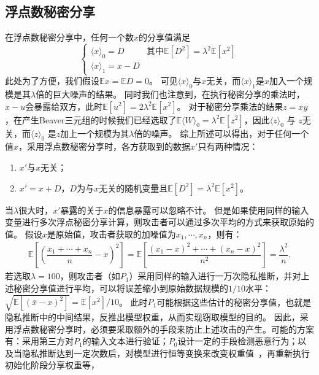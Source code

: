 \subsection{浮点数秘密分享}
在浮点数秘密分享中，任何一个数$x$的分享值满足
\begin{equation}
\begin{cases}
    \langle x \rangle_0 = D & \text{其中} \mathbb E[D^2] = \lambda^2 \mathbb E[x^2] \\
    \langle x \rangle_1 = x - D
\end{cases}
\end{equation}
此处为了方便，我们假设$\mathbb Ex = \mathbb ED = 0$。
%
可见$\langle x \rangle_0$与$x$无关，而$\langle x \rangle_1$是$x$加入一个规模是其$\lambda$倍的巨大噪声的结果。
%
同时我们也注意到，在执行秘密分享的乘法时，$x - u$会暴露给双方，此时$\mathbb E[u^2] = 2\lambda^2 \mathbb E[x^2]$。
%
对于秘密分享乘法的结果$z = xy$，在产生Beaver三元组的时候我们已经选取了$\mathbb E \langle W \rangle_0 = \lambda^2 \mathbb E[z^2]$，因此$\langle z \rangle_0$ 与 $z$无关，而$\langle z \rangle_0$ 是$z$加上一个规模为其$\lambda$倍的噪声。
%
综上所述可以得出，对于任何一个值$x$，采用浮点数秘密分享时，各方获取到的数据$x'$只有两种情况：
\begin{enumerate}[label=(\arabic*)]
    \item $x'$与$x$无关；
    \item $x' = x + D$，$D$为与$x$无关的随机变量且$\mathbb E[D^2] = \lambda^2 \mathbb E[x^2]$。
\end{enumerate}
%
当$\lambda$很大时，$x'$暴露的关于$x$的信息暴露可以忽略不计。
%
但是如果使用同样的输入变量进行多次浮点秘密分享计算，则攻击者可以通过多次平均的方式来获取原始的值。
%
假设$x$是原始值，攻击者获取的加噪值为$x_1, \cdots, x_n$，则有：
\begin{equation}
\begin{split}
    \mathbb E\left[\left(\dfrac{x_1 + \cdots + x_n}{n} - x \right)^2 \right] = 
    \mathbb E\left[\dfrac{(x_1 - x)^2 + \cdots + (x_n - x)^2}{n^2} \right] =
    \dfrac{\lambda^2}{n}.
\end{split}
\end{equation}
%
若选取$\lambda = 100$，则攻击者（如$P_1$）采用同样的输入进行一万次隐私推断，并对上述秘密分享值进行平均，可以将误差缩小到原始数据规模的$1/10$水平：
$\sqrt{\mathbb E[(\bar x - x)^2]} = {\mathbb E[x^2]}/{10}$。
%
此时$P_1$可能根据这些估计的秘密分享值，也就是隐私推断中的中间结果，反推出模型权重，从而实现窃取模型的目的。
%
因此，采用浮点数秘密分享时，必须要采取额外的手段来防止上述攻击的产生。可能的方案有：采用第三方对$P_1$的输入文本进行验证；$P_0$设计一定的手段检测恶意行为；以及当隐私推断达到一定次数后，对模型进行恒等变换来改变权重值~\cite{xuhengyuan_2024_permutation_transformer}，再重新执行初始化阶段分享权重等，
%


